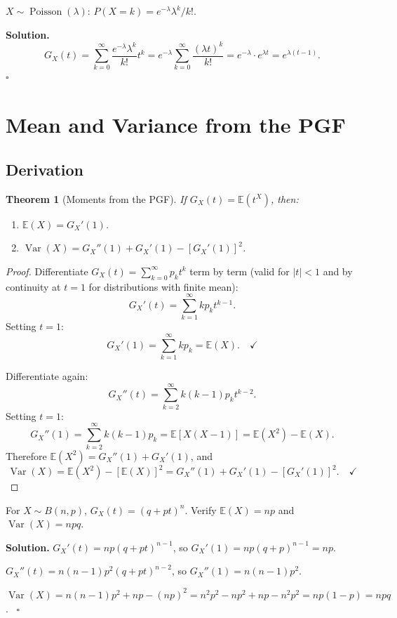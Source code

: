\documentclass[12pt, a4paper, oneside]{book}
\theoremstyle{definition}
\theoremstyle{plain}
\newtheorem{theorem}{Theorem}[section]
\theoremstyle{remark}
\newcommand{\E}{\mathbb{E}}
\newcommand{\Var}{\operatorname{Var}}
\newenvironment{solution}
  {\par\medskip\noindent\textbf{Solution.}\quad}
  {\hfill$\square$\par\medskip}
\begin{document}
\begin{workedexample}
$X\sim\operatorname{Poisson}(\lambda)$: $P(X=k)=e^{-\lambda}\lambda^k/k!$.

\begin{solution}
\[
  G_X(t) = \sum_{k=0}^\infty\frac{e^{-\lambda}\lambda^k}{k!}t^k
  = e^{-\lambda}\sum_{k=0}^\infty\frac{(\lambda t)^k}{k!}
  = e^{-\lambda}\cdot e^{\lambda t}
  = e^{\lambda(t-1)}.
\]
\end{solution}
\end{workedexample}

\section{Mean and Variance from the PGF}
\label{sec:pgf-moments}

\subsection{Derivation}

\begin{theorem}[Moments from the PGF]
\label{thm:pgf-moments}
If $G_X(t) = \E(t^X)$, then:
\begin{enumerate}[label=\textbf{(\roman*)}]
  \item $\E(X) = G_X'(1)$.
  \item $\Var(X) = G_X''(1) + G_X'(1) - [G_X'(1)]^2$.
\end{enumerate}
\end{theorem}

\begin{proof}
Differentiate $G_X(t) = \sum_{k=0}^\infty p_k t^k$ term by term
(valid for $|t|<1$ and by continuity at $t=1$ for distributions with
finite mean):
\[
  G_X'(t) = \sum_{k=1}^\infty k p_k t^{k-1}.
\]
Setting $t=1$:
\[
  G_X'(1) = \sum_{k=1}^\infty k p_k = \E(X). \quad\checkmark
\]

Differentiate again:
\[
  G_X''(t) = \sum_{k=2}^\infty k(k-1)p_k t^{k-2}.
\]
Setting $t=1$:
\[
  G_X''(1) = \sum_{k=2}^\infty k(k-1)p_k = \E[X(X-1)] = \E(X^2) - \E(X).
\]
Therefore $\E(X^2) = G_X''(1) + G_X'(1)$, and
\[
  \Var(X) = \E(X^2) - [\E(X)]^2 = G_X''(1) + G_X'(1) - [G_X'(1)]^2. \quad\checkmark
\]
\end{proof}

\begin{workedexample}
For $X\sim B(n,p)$, $G_X(t)=(q+pt)^n$.  Verify $\E(X)=np$ and
$\Var(X)=npq$.

\begin{solution}
$G_X'(t) = np(q+pt)^{n-1}$, so $G_X'(1) = np(q+p)^{n-1} = np$.\ \checkmark

$G_X''(t) = n(n-1)p^2(q+pt)^{n-2}$, so $G_X''(1) = n(n-1)p^2$.

$\Var(X) = n(n-1)p^2 + np - (np)^2 = n^2p^2 - np^2 + np - n^2p^2
= np(1-p) = npq$.\ \checkmark
\end{solution}
\end{workedexample}
\end{document}
